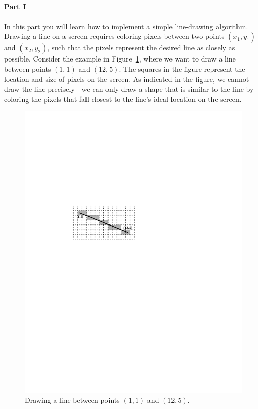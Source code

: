 \documentclass[epsfig,10pt,fullpage]{article}
\begin{document}
~\\
\noindent
{\bf Part I}
~\\
~\\
\noindent
In this part you will learn how to implement a simple line-drawing algorithm.
Drawing a line on a screen requires coloring pixels between two points $(x_1,y_1)$ and 
$(x_2,y_2)$, such that the pixels represent the desired line as closely as possible. Consider 
the example in Figure~\ref{fig:line_drawing}, where we want to draw a line between 
points $(1,1)$ and $(12,5)$. The squares in the figure represent the location and size of pixels
on the screen. As indicated in the figure, we cannot draw the line precisely---we can
only draw a shape that is similar to the line by coloring the pixels that fall closest to 
the line's ideal location on the screen.

\begin{figure}[b]
   \begin{center}
       \includegraphics{figures/fig_line_drawing}
   \end{center}
   \caption{Drawing a line between points $(1,1)$ and $(12,5)$.}
	\label{fig:line_drawing}
\end{figure}
\end{document}
